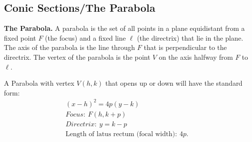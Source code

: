 \documentclass{report}
\begin{document}
    \pagebreak \bigbreak \noindent

    \pagebreak \bigbreak \noindent
    \subsection{Conic Sections/The Parabola}
    \begin{figure}[ht]
        \centering
        \def\svgwidth{\columnwidth}
        \label{fig:conic}
    \end{figure}
    \pagebreak \bigbreak \noindent
    \begin{mdframed}
      \textbf{The Parabola.}
      \bigbreak \noindent 
      A parabola is the set of all points in a plane equidistant from a fixed point $F$ (the focus) and a fixed line $\ell$ (the directrix) that lie in the plane.
      \bigbreak \noindent 
      The axis of the parabola is the line through $F$ that is perpendicular to the directrix.
      \bigbreak \noindent 
      The vertex of the parabola is the point $V$ on the axis halfway from $F$ to $\ell$.
    \end{mdframed}

    \bigbreak \noindent 
    A Parabola with vertex $V(h,k)$ that opens up or down will have the standard form:
    \begin{align*}
      (x-h)^{2} = 4p(y-k ) \\
      Focus:\ F(h,k + p) \\
      Directrix:\ y =k - p \\
      \text{Length of latus rectum (focal width)}:\ 4p
    .\end{align*}
    \bigbreak \noindent 
\end{document}
